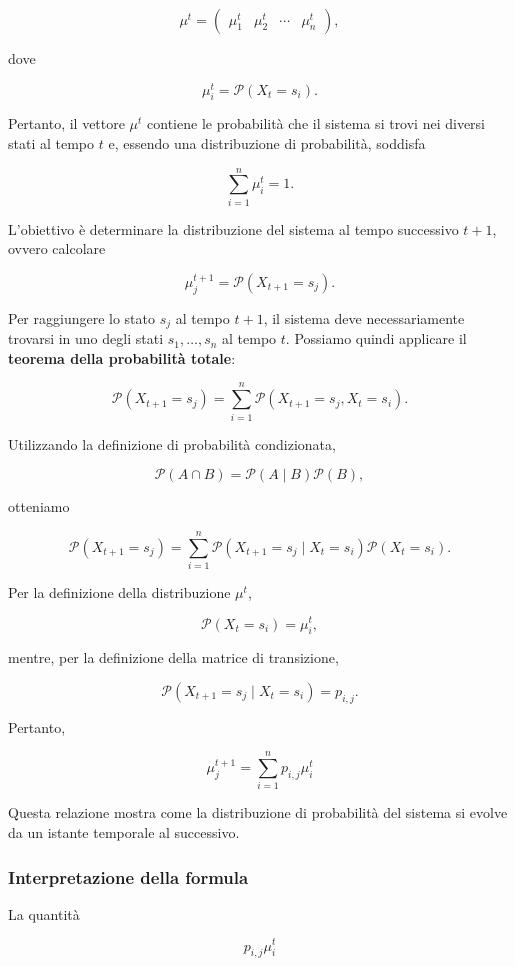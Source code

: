 \[
\mu^t =
\begin{pmatrix}
\mu_1^t & \mu_2^t & \cdots & \mu_n^t
\end{pmatrix},
\]

dove

\[
\mu_i^t = \mathcal{P}(X_t=s_i).
\]

Pertanto, il vettore $\mu^t$ contiene le probabilità che il sistema si trovi nei diversi stati al tempo $t$ e, essendo una distribuzione di probabilità, soddisfa

\[
\sum_{i=1}^{n}\mu_i^t=1.
\]

L'obiettivo è determinare la distribuzione del sistema al tempo successivo $t+1$, ovvero calcolare

\[
\mu_j^{t+1}
=
\mathcal{P}(X_{t+1}=s_j).
\]

Per raggiungere lo stato $s_j$ al tempo $t+1$, il sistema deve necessariamente trovarsi in uno degli stati $s_1,\dots,s_n$ al tempo $t$. Possiamo quindi applicare il \textbf{teorema della probabilità totale}:

\[
\mathcal{P}(X_{t+1}=s_j)
=
\sum_{i=1}^{n}
\mathcal{P}(X_{t+1}=s_j,X_t=s_i).
\]

Utilizzando la definizione di probabilità condizionata,

\[
\mathcal{P}(A\cap B)
=
\mathcal{P}(A\mid B)\mathcal{P}(B),
\]

otteniamo

\[
\mathcal{P}(X_{t+1}=s_j)
=
\sum_{i=1}^{n}
\mathcal{P}(X_{t+1}=s_j\mid X_t=s_i)
\mathcal{P}(X_t=s_i).
\]

Per la definizione della distribuzione $\mu^t$,

\[
\mathcal{P}(X_t=s_i)=\mu_i^t,
\]

mentre, per la definizione della matrice di transizione,

\[
\mathcal{P}(X_{t+1}=s_j\mid X_t=s_i)=p_{i,j}.
\]

Pertanto,

\[
\boxed{
\mu_j^{t+1}
=
\sum_{i=1}^{n}p_{i,j}\mu_i^t
}
\]

Questa relazione mostra come la distribuzione di probabilità del sistema si evolve da un istante temporale al successivo.

\subsubsection{Interpretazione della formula}

La quantità

\[
p_{i,j}\mu_i^t
\]

